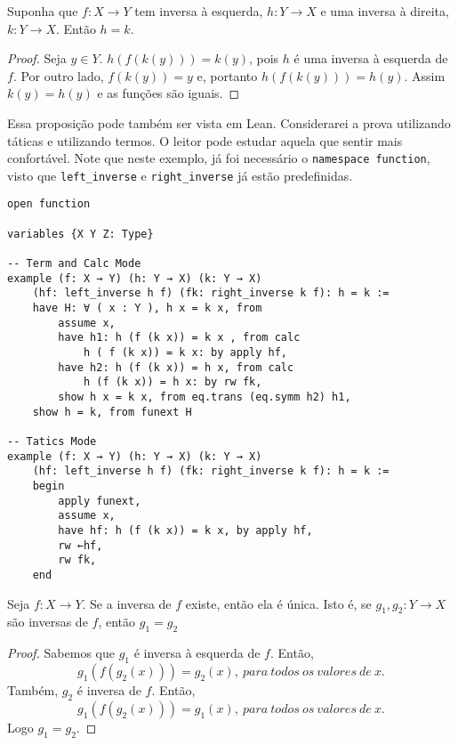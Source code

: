 \begin{theorem}
    \label{prop2}
    Suponha que $f : X \to Y $ tem inversa à esquerda, $h : Y \to X $ e uma
    inversa à direita, $k : Y \to X $. Então $h = k$.
\end{theorem}
\begin{proof}
    Seja $y \in Y$. $h(f(k(y))) = k(y)$, pois $h$ é uma inversa à esquerda de
    $f$. Por outro lado, $f(k(y)) = y$ e, portanto $h(f(k(y))) = h(y)$. Assim
    $k(y) = h(y) $ e as funções são iguais.
\end{proof}

Essa proposição pode também ser vista em Lean. Considerarei a prova utilizando
táticas e utilizando termos. O leitor pode estudar aquela que sentir mais
confortável. Note que neste exemplo, já foi necessário o \lstinline{namespace function}, visto que \lstinline{left_inverse} e \lstinline{right_inverse} já
estão predefinidas.

\begin{lstlisting}
open function

variables {X Y Z: Type}

-- Term and Calc Mode
example (f: X → Y) (h: Y → X) (k: Y → X)
    (hf: left_inverse h f) (fk: right_inverse k f): h = k :=
    have H: ∀ ( x : Y ), h x = k x, from
        assume x,
        have h1: h (f (k x)) = k x , from calc
            h ( f (k x)) = k x: by apply hf,
        have h2: h (f (k x)) = h x, from calc
            h (f (k x)) = h x: by rw fk,
        show h x = k x, from eq.trans (eq.symm h2) h1,
    show h = k, from funext H

-- Tatics Mode
example (f: X → Y) (h: Y → X) (k: Y → X)
    (hf: left_inverse h f) (fk: right_inverse k f): h = k :=
    begin
        apply funext,
        assume x,
        have hf: h (f (k x)) = k x, by apply hf,
        rw ←hf,
        rw fk,
    end
\end{lstlisting}

\begin{theorem}
    \label{prop3}
    Seja $f: X \to Y$. Se a inversa de $f$ existe, então ela é única. Isto é,
    se $g_1, g_2: Y \to X$ são inversas de $f$, então $g_1 = g_2$
\end{theorem}
\begin{proof}
    Sabemos que $g_1$ é inversa à esquerda de $f$. Então,
    $$g_1(f(g_2(x))) = g_2(x), ~para~todos~os~valores~de~x.$$ Também, $g_2$ é
    inversa de $f$. Então,
    $$g_1(f(g_2(x))) = g_1(x), ~para~todos~os~valores~de~x.$$ Logo $g_1 =
    g_2$.
\end{proof}

